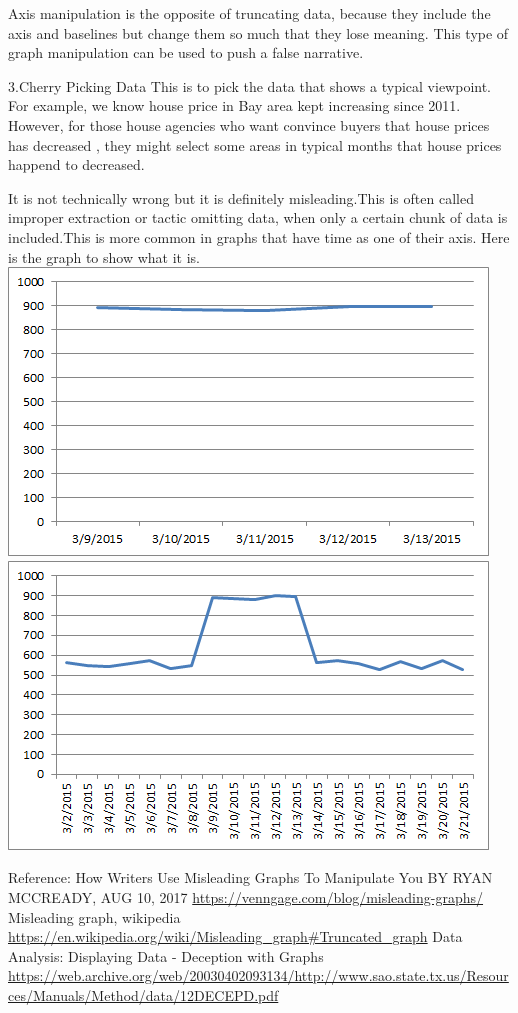 \documentclass[]{book}
\theoremstyle{definition}
\theoremstyle{definition}
\theoremstyle{definition}
\theoremstyle{remark}
\begin{document}
Axis manipulation is the opposite of truncating data, because they
include the axis and baselines but change them so much that they lose
meaning. This type of graph manipulation can be used to push a false
narrative.

3.Cherry Picking Data This is to pick the data that shows a typical
viewpoint. For example, we know house price in Bay area kept increasing
since 2011. However, for those house agencies who want convince buyers
that house prices has decreased , they might select some areas in
typical months that house prices happend to decreased.

It is not technically wrong but it is definitely misleading.This is
often called improper extraction or tactic omitting data, when only a
certain chunk of data is included.This is more common in graphs that
have time as one of their axis. Here is the graph to show what it is.
\includegraphics{images/Bad_graph_extraction.png}
\includegraphics{images/Good_graph_extraction.png}

Reference: How Writers Use Misleading Graphs To Manipulate You BY RYAN
MCCREADY, AUG 10, 2017
\url{https://venngage.com/blog/misleading-graphs/} Misleading graph,
wikipedia
\url{https://en.wikipedia.org/wiki/Misleading_graph\#Truncated_graph}
Data Analysis: Displaying Data - Deception with Graphs
\url{https://web.archive.org/web/20030402093134/http://www.sao.state.tx.us/Resources/Manuals/Method/data/12DECEPD.pdf}
\end{document}
